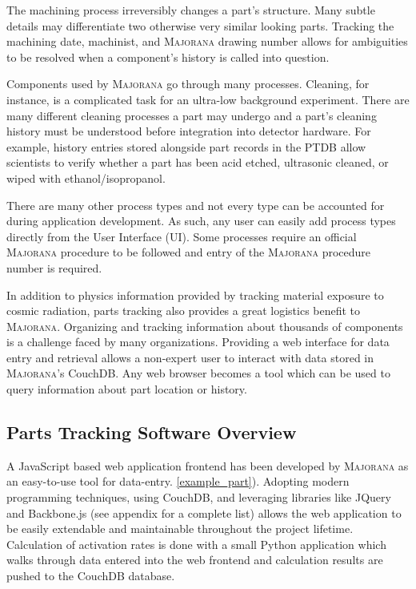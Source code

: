 \documentclass[journal]{IEEEtran}
\begin{document}
The machining process irreversibly changes a part's structure. Many subtle details may differentiate
two otherwise very similar looking parts. Tracking the machining date, machinist, and \textsc{Majorana} drawing number allows
for ambiguities to be resolved when a component's history is called into question. 

Components used by \textsc{Majorana} go through many processes. Cleaning, for instance, is a complicated task for an ultra-low
background experiment. There are many different cleaning processes a part may undergo and a part's cleaning history
must be understood before integration into detector hardware. For example, history entries stored alongside part records in the PTDB
allow scientists to verify whether a part has been acid etched, ultrasonic cleaned, or wiped with ethanol/isopropanol.

There are many other process types and not every type can
be accounted for during application development. As such, any user can 
easily add process types directly from the User Interface (UI). Some processes require an official \textsc{Majorana} procedure to be
followed and entry of the \textsc{Majorana} procedure number is required.

In addition to physics information provided by tracking material exposure to cosmic radiation, parts tracking also provides
a great logistics benefit to \textsc{Majorana}. Organizing and tracking information about thousands of components is a
challenge faced by many organizations. Providing a web interface for data entry and retrieval allows
a non-expert user to interact with data stored in \textsc{Majorana}'s CouchDB. Any web browser becomes a tool which can
be used to query information about part location or history.

\subsection{Parts Tracking Software Overview}
A JavaScript based web application frontend has been developed by \textsc{Majorana} as an easy-to-use tool for data-entry. \ref{example_part}).
Adopting modern programming techniques, using CouchDB, and leveraging libraries like JQuery and Backbone.js (see appendix for a complete list) allows the
web application to be easily extendable and maintainable throughout the project lifetime. Calculation of
activation rates is done with a small Python application which walks through data entered into the web
frontend and calculation results are pushed to the CouchDB database.
\end{document}

